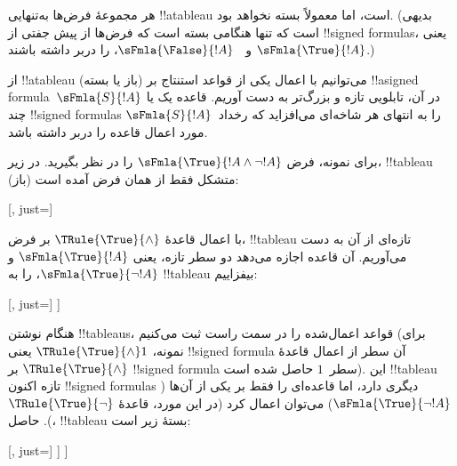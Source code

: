 \documentclass[../../../include/open-logic-section]{subfiles}
\begin{document}
\begin{ex}
  هر مجموعهٔ فرض‌ها به‌تنهایی !!a{tableau} است، اما معمولاً بسته نخواهد
  بود. (بدیهی است که تنها هنگامی بسته است که فرض‌ها از پیش جفتی از
  !!{signed formula}s، یعنی $\sFmla{\True}{!A}$ و
  ~$\sFmla{\False}{!A}$، را دربر داشته باشند.)

  از !!a{tableau} (باز یا بسته) می‌توانیم با اعمال یکی از قواعد استنتاج
  بر !!a{signed formula}~$\sFmla{S}{!A}$ در آن، تابلویی تازه و بزرگ‌تر
  به دست آوریم. قاعده یک یا چند !!{signed formula}s را به انتهای هر شاخه‌ای
  می‌افزاید که رخداد~$\sFmla{S}{!A}$ مورد اعمال قاعده را دربر داشته باشد.

  برای نمونه، فرض $\sFmla{\True}{!A \land \lnot
    !A}$ را در نظر بگیرید. در زیر، !!{tableau} (باز) متشکل فقط از همان
  فرض آمده است:
  \begin{center}
    \begin{tableau}{}
      [, just=\TAss]
    \end{tableau}{}
  \end{center}
  با اعمال قاعدهٔ $\TRule{\True}{\land}$ بر فرض، !!{tableau} تازه‌ای از
  آن به دست می‌آوریم. آن قاعده اجازه می‌دهد دو سطر تازه، یعنی
  $\sFmla{\True}{!A}$ و $\sFmla{\True}{\lnot !A}$، را به !!{tableau}
  بیفزاییم:
  \begin{center}
    \begin{tableau}{}
      [, just=\TAss
        [\sFmla{\True}{\formula{A}}, just={\TRule{\True}{\land}[1]},
          [\sFmla{\True}{\lnot \formula{A}}, just={\TRule{\True}{\land}[1]}
          ]
        ]
      ]
    \end{tableau}{}
  \end{center}
  هنگام نوشتن !!{tableau}s، قواعد اعمال‌شده را در سمت راست ثبت می‌کنیم
  (برای نمونه، $\TRule{\True}{\land} 1$ یعنی !!{signed formula} آن سطر از
  اعمال قاعدهٔ $\TRule{\True}{\land}$ بر !!{signed formula} سطر~$1$ حاصل
  شده است). این !!{tableau} تازه اکنون !!{signed formula}s دیگری دارد،
  اما قاعده‌ای را فقط بر یکی از آن‌ها ($\sFmla{\True}{\lnot !A}$) می‌توان
  اعمال کرد (در این مورد، قاعدهٔ $\TRule{\True}{\lnot}$). حاصل،
  !!{tableau} بستهٔ زیر است:
  \begin{center}
    \begin{tableau}{}
      [, just=\TAss
        [\sFmla{\True}{\formula{A}}, just={\TRule{\True}{\land}[1]}
          [\sFmla{\True}{\lnot \formula{A}}, just={\TRule{\True}{\land}[1]}
            [\sFmla{\False}{\formula{A}}, just={\TRule{\True}{\lnot}[3]}, close]
          ]
        ]
      ]
    \end{tableau}{}
  \end{center}
\end{ex}
\end{document}

